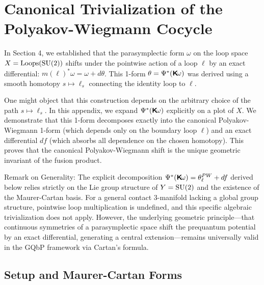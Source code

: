 \documentclass[11pt,reqno,letterpaper,twoside]{amsart}
\renewcommand{\Komega}{\CHO\!\omega}
\begin{document}
  \appendix
  
  
  \section{Canonical Trivialization of the Polyakov-Wiegmann Cocycle}
  \label{app:canonical_pw}
  
  In Section 4,
  we established that the parasymplectic form $\omega$ on the loop space $X = \operatorname{Loops}(\mathrm{SU}(2))$ shifts under the pointwise action of a loop $\ell$ by an exact differential:
  $m(\ell)^*\omega = \omega + d\theta$.
  This 1-form $\theta = \Psi^*(\Komega)$ was derived using a smooth homotopy $s \mapsto \ell_s$ connecting the identity loop to $\ell$.
  
  One might object that this construction depends on the arbitrary choice of the path $s \mapsto \ell_s$.
  In this appendix,
  we expand $\Psi^*(\Komega)$ explicitly on a plot of $X$.
  We demonstrate that this 1-form decomposes exactly into the canonical Polyakov-Wiegmann 1-form (which depends only on the boundary loop $\ell$) and an exact differential $df$ (which absorbs all dependence on the chosen homotopy).
  This proves that the canonical Polyakov-Wiegmann shift is the unique geometric invariant of the fusion product.
  
  Remark on Generality:
  The explicit decomposition $\Psi^*(\Komega) = \theta^{PW}_\ell + df$ derived below relies strictly on the Lie group structure of $Y = \mathrm{SU}(2)$ and the existence of the Maurer-Cartan basis.
  For a general contact 3-manifold lacking a global group structure,
  pointwise loop multiplication is undefined,
  and this specific algebraic trivialization does not apply.
  However,
  the underlying geometric principle—that continuous symmetries of a parasymplectic space shift the prequantum potential by an exact differential,
  generating a central extension—remains universally valid in the GQbP framework via Cartan's formula.
  
  \subsection{Setup and Maurer-Cartan Forms}
  
\end{document}
